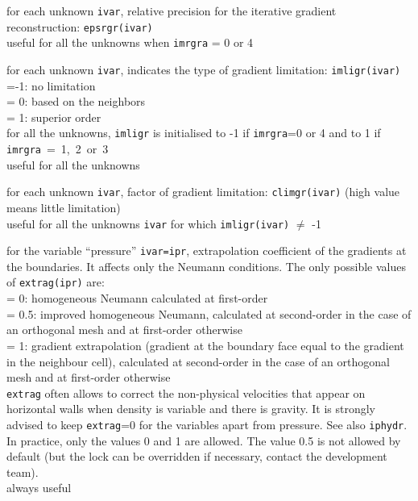 {for each unknown {\tt ivar}, relative precision for the iterative gradient
reconstruction: {\tt epsrgr(ivar)}\\
useful for all the unknowns when {\tt imrgra} = 0 or 4}

{for each unknown {\tt ivar}, indicates the type of gradient limitation:
{\tt imligr(ivar)}\\
\hspace*{1.3cm}=-1: no limitation\\
\hspace*{1.3cm}= 0: based on the neighbors\\
\hspace*{1.3cm}= 1: superior order\\
for all the unknowns, {\tt imligr} is initialised to -1 if {\tt imrgra}=0 or 4
 and to 1 if \mbox{{\tt imrgra} = 1, 2 or 3}\\
useful for all the unknowns}

{for each unknown {\tt ivar}, factor of gradient limitation: {\tt climgr(ivar)}
(high value means little limitation)\\
useful for all the unknowns {\tt ivar} for which {\tt imligr(ivar)} $\ne$ -1}

{for the variable ``pressure'' {\tt ivar=ipr}, extrapolation coefficient
of the gradients at the boundaries. It affects only the Neumann conditions.
The only possible values of {\tt extrag(ipr)} are:\\
\hspace*{1.3cm}= 0: homogeneous Neumann calculated at first-order\\
\hspace*{1.3cm}= 0.5: improved homogeneous Neumann, calculated at
second-order in the case of an orthogonal mesh and at first-order otherwise\\
\hspace*{1.3cm}= 1: gradient extrapolation (gradient at the boundary face
equal to the gradient in the neighbour cell), calculated at
second-order in the case of an orthogonal mesh and at first-order otherwise\\
{\tt extrag} often allows to correct the non-physical velocities that
appear on horizontal walls when density is variable and there is gravity.
It is strongly advised to keep {\tt extrag}=0 for the variables apart from
pressure. See also {\tt iphydr}.\\
In practice, only the values 0 and 1 are allowed. The
value 0.5 is not allowed by default (but the lock can be overridden if
necessary, contact the development team).\\
always useful}

